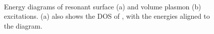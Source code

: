 \begin{refsection}
\begin{figure}[ht] 
    \centering 
    \begin{subfigure}[t]{0.6\textwidth} 
        \centering 
        
         
        \caption{} 
    \end{subfigure}%
    ~  
    \begin{subfigure}[t]{0.4\textwidth} 
        \centering 
        
         
        \caption{} 
    \end{subfigure} 
\caption{Energy diagrams of resonant surface (a) and volume plasmon (b) 
excitations. (a) also shows the DOS of , with the energies 
aligned to the diagram.} 
\label{quotas:fig-plasmons} 
\end{figure} 
 

\end{refsection}
